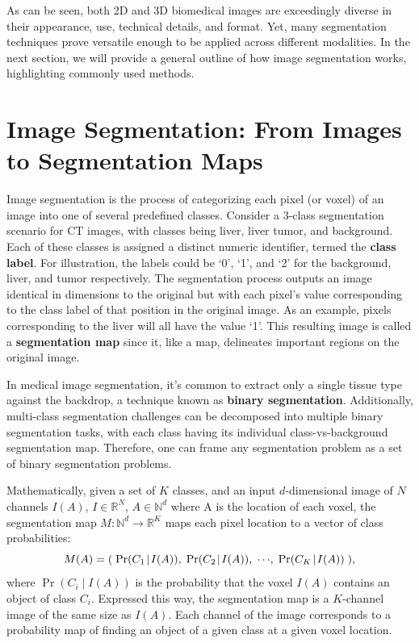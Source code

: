 As can be seen, both 2D and 3D biomedical images are exceedingly diverse in their appearance, use, technical details, and format. Yet, many segmentation techniques prove versatile enough to be applied across different modalities. In the next section, we will provide a general outline of how image segmentation works, highlighting commonly used methods.

\section{Image Segmentation: From Images to Segmentation Maps}

Image segmentation is the process of categorizing each pixel (or voxel) of an image into one of several predefined classes. Consider a 3-class segmentation scenario for CT images, with classes being liver, liver tumor, and background. Each of these classes is assigned a distinct numeric identifier, termed the \textbf{class label}. For illustration, the labels could be `0', `1', and `2' for the background, liver, and tumor respectively. The segmentation process outputs an image identical in dimensions to the original but with each pixel's value corresponding to the class label of that position in the original image. As an example, pixels corresponding to the liver will all have the value `1'. This resulting image is called a \textbf{segmentation map} since it, like a map, delineates important regions on the original image. 

In medical image segmentation, it's common to extract only a single tissue type against the backdrop, a technique known as \textbf{binary segmentation}. Additionally, multi-class segmentation challenges can be decomposed into multiple binary segmentation tasks, with each class having its individual class-vs-background segmentation map. Therefore, one can frame any segmentation problem as a set of binary segmentation problems.

Mathematically, given a set of $K$ classes, and an input $d$-dimensional image of $N$ channels $I(A)$, $I \in \mathbb{R}^{N}$, $A \in \mathbb{N}^d$ where A is the location of each voxel, the segmentation map $M : \mathbb{N}^d \rightarrow \mathbb{R}^K$ maps each pixel location to a vector of class probabilities:
\begin{equation}
M(A) = (\;\operatorname{Pr}({C_1}\!\mid\!{I(A)}),\; \operatorname{Pr}({C_2}\!\mid\!{I(A)}),\; \cdots\!,\;  \operatorname{Pr}({C_{K}}\!\mid\!{I(A)})\;),
\end{equation}
where $\operatorname{Pr} (C_i \!\mid\! I(A))$ is the probability that the voxel $I(A)$ contains an object of class $C_i$. Expressed this way, the segmentation map is a $K$-channel image of the same size as $I(A)$. Each channel of the image corresponds to a probability map of finding an object of a given class at a given voxel location. 

